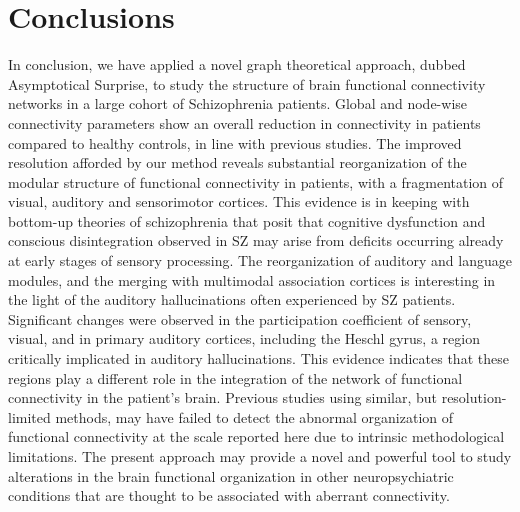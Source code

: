 \section{Conclusions}
In conclusion, we have applied a novel graph theoretical approach, dubbed Asymptotical Surprise, to study the structure of brain functional connectivity networks in a large cohort of Schizophrenia patients.
Global and node-wise connectivity parameters show an overall reduction in connectivity in patients compared to healthy controls, in line with previous studies.
The improved resolution afforded by our method reveals substantial reorganization of the modular structure of functional connectivity in patients, with a fragmentation of visual, auditory and sensorimotor cortices.
This evidence is in keeping with bottom-up theories of schizophrenia that posit that cognitive dysfunction and conscious disintegration observed in SZ may arise from deficits occurring already at early stages of sensory processing.
The reorganization of auditory and language modules, and the merging with multimodal association cortices is interesting in the light of the auditory hallucinations often experienced by SZ patients.
Significant changes were observed in the participation coefficient of sensory, visual, and in primary auditory cortices, including the Heschl gyrus, a region critically implicated in auditory hallucinations.
This evidence indicates that these regions play a different role in the integration of the network of functional connectivity in the patient's brain.
Previous studies using similar, but resolution-limited methods, may have failed to detect the abnormal organization of functional connectivity at the scale reported here due to intrinsic methodological limitations.
The present approach may provide a novel and powerful tool to study alterations in the brain functional organization in other neuropsychiatric conditions that are thought to be associated with aberrant connectivity.


